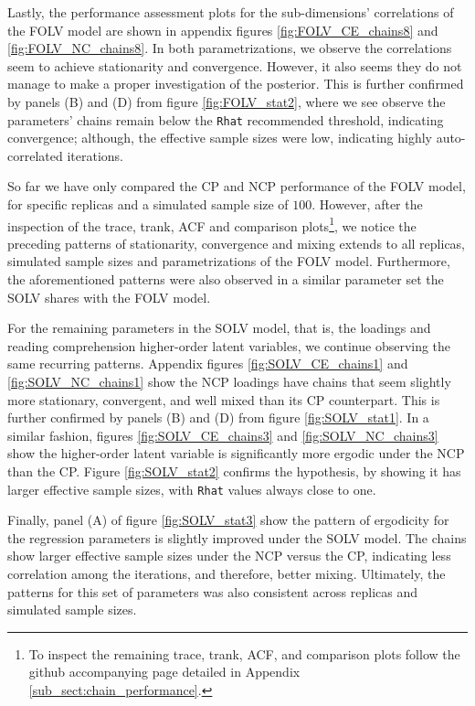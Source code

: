 Lastly, the performance assessment plots for the sub-dimensions' correlations of the FOLV model are shown in appendix figures \ref{fig:FOLV_CE_chains8} and \ref{fig:FOLV_NC_chains8}. In both parametrizations, we observe the correlations seem to achieve stationarity and convergence. However, it also seems they do not manage to make a proper investigation of the posterior. This is further confirmed by panels (B) and (D) from figure \ref{fig:FOLV_stat2}, where we see observe the parameters' chains remain below the \texttt{Rhat} recommended threshold, indicating convergence; although, the effective sample sizes were low, indicating highly auto-correlated iterations.

So far we have only compared the CP and NCP performance of the FOLV model, for specific replicas and a simulated sample size of $100$. However, after the inspection of the trace, trank, ACF and comparison plots\footnote{To inspect the remaining trace, trank, ACF, and comparison plots follow the github accompanying page detailed in Appendix \ref{sub_sect:chain_performance}.}, we notice the preceding patterns of stationarity, convergence and mixing extends to all replicas, simulated sample sizes and parametrizations of the FOLV model. Furthermore, the aforementioned patterns were also observed in a similar parameter set the SOLV shares with the FOLV model. 

For the remaining parameters in the SOLV model, that is, the loadings and reading comprehension higher-order latent variables, we continue observing the same recurring patterns. Appendix figures \ref{fig:SOLV_CE_chains1} and \ref{fig:SOLV_NC_chains1} show the NCP loadings have chains that seem slightly more stationary, convergent, and well mixed than its CP counterpart. This is further confirmed by panels (B) and (D) from figure \ref{fig:SOLV_stat1}. In a similar fashion, figures \ref{fig:SOLV_CE_chains3} and \ref{fig:SOLV_NC_chains3} show the higher-order latent variable is significantly more ergodic under the NCP than the CP. Figure \ref{fig:SOLV_stat2} confirms the hypothesis, by showing it has larger effective sample sizes, with \texttt{Rhat} values always close to one.

Finally, panel (A) of figure \ref{fig:SOLV_stat3} show the pattern of ergodicity for the regression parameters is slightly improved under the SOLV model. The chains show larger effective sample sizes under the NCP versus the CP, indicating less correlation among the iterations, and therefore, better mixing. Ultimately, the patterns for this set of parameters was also consistent across replicas and simulated sample sizes.

